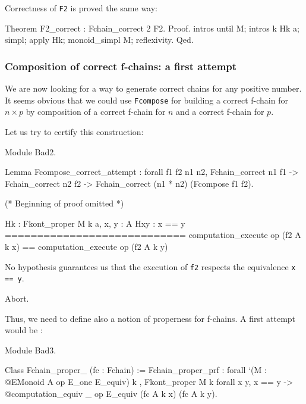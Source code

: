 Correctness of \texttt{F2} is proved the same way:

\begin{Coqsrc}
Theorem F2_correct : Fchain_correct 2 F2.
Proof. 
  intros until M; intros k Hk a; simpl;
  apply Hk;  monoid_simpl M;  reflexivity.
Qed.
\end{Coqsrc}

\subsubsection{Composition of correct f-chains: a first attempt}

We are now looking for a way to generate correct chains for any positive 
number. It seems obvious that we could use \texttt{Fcompose} for building 
a correct f-chain for $n\times p$ by composition of a correct f-chain for 
$n$ and a correct f-chain for $p$.

Let us try to certify this construction:

\begin{Coqbad}
Module Bad2.

Lemma Fcompose_correct_attempt :
  forall f1 f2 n1 n2, Fchain_correct n1 f1 ->
                      Fchain_correct n2 f2 ->
                      Fchain_correct (n1 * n2) (Fcompose f1 f2).

(* Beginning of proof omitted *)
\end{Coqbad}

\begin{Coqanswer}
  Hk : Fkont_proper M k
  a, x, y : A
  Hxy : x == y
  ============================
   computation_execute op (f2 A k x) == 
   computation_execute op (f2 A k y) 
\end{Coqanswer}

No hypothesis guarantees us that the execution of \texttt{f2} respects the equivalence
\texttt{x == y}.

\begin{Coqbad}
Abort.
\end{Coqbad}

 Thus, we need to define also a  notion of properness for f-chains. 
A first attempt would be :


\begin{Coqbad}
Module Bad3.

Class Fchain_proper_ (fc : Fchain) := Fchain_proper_prf : 
 forall  `(M : @EMonoid A op E_one E_equiv) k  ,
    Fkont_proper M k 
    forall x y, x == y ->
        @computation_equiv _ op E_equiv (fc A k x) (fc A k y).
\end{Coqbad}

